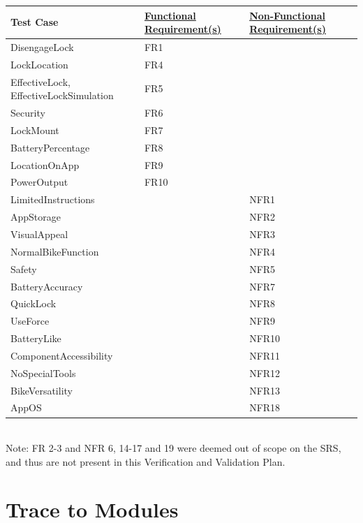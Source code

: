 \documentclass[12pt, titlepage]{article}
\begin{document}
\begin{minipage}{\textwidth}
\footnotesize
{}
\renewcommand*{\arraystretch}{1.5}
\begin{tabular}{| p{} | p{} | p{} |}
 \hline
 Test Case & \href{https://github.com/NevoAbigail/Capstone/blob/main/docs/SRS/SRS.pdf}{Functional Requirement(s)} & \href{https://github.com/NevoAbigail/Capstone/blob/main/docs/SRS/SRS.pdf}{Non-Functional Requirement(s)} \\ 
 \hline
 DisengageLock & FR1 &  \\ 
  \hline
 LockLocation & FR4 &  \\ 
  \hline
 EffectiveLock, EffectiveLockSimulation & FR5 &  \\ 
  \hline
 Security & FR6 &  \\ 
  \hline
 LockMount & FR7 &  \\ 
  \hline
 BatteryPercentage & FR8 &  \\ 
  \hline
 LocationOnApp & FR9 &  \\ 
  \hline
 PowerOutput & FR10 &  \\ 
  \hline
 LimitedInstructions & & NFR1 \\
 \hline
  AppStorage & & NFR2 \\
 \hline
  VisualAppeal & & NFR3 \\
 \hline
  NormalBikeFunction & & NFR4 \\
 \hline
  Safety & & NFR5 \\
 \hline
  BatteryAccuracy & & NFR7 \\
 \hline
  QuickLock & & NFR8 \\
 \hline
 UseForce & & NFR9 \\
 \hline
 BatteryLike & & NFR10 \\
 \hline
  ComponentAccessibility & & NFR11 \\
 \hline
  NoSpecialTools & & NFR12 \\
 \hline
  BikeVersatility & & NFR13 \\
 \hline
  AppOS & & NFR18 \\
 \hline
 \end{tabular}
\end{minipage}\\

Note: FR 2-3 and NFR 6, 14-17 and 19 were deemed out of scope on the SRS, and thus are not present in this Verification and Validation Plan. 
		
\section{Trace to Modules}		
\end{document}

